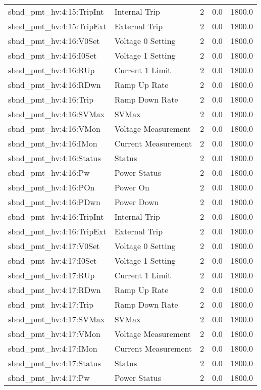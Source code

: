 \begin{center}
\begin{longtable}{l | l l l l }
sbnd\_pmt\_hv:4:15:TripInt & Internal Trip & 2 & 0.0 & 1800.0\\ 
sbnd\_pmt\_hv:4:15:TripExt & External Trip & 2 & 0.0 & 1800.0\\ 
sbnd\_pmt\_hv:4:16:V0Set & Voltage 0 Setting & 2 & 0.0 & 1800.0\\ 
sbnd\_pmt\_hv:4:16:I0Set & Voltage 1 Setting & 2 & 0.0 & 1800.0\\ 
sbnd\_pmt\_hv:4:16:RUp & Current 1 Limit & 2 & 0.0 & 1800.0\\ 
sbnd\_pmt\_hv:4:16:RDwn & Ramp Up Rate & 2 & 0.0 & 1800.0\\ 
sbnd\_pmt\_hv:4:16:Trip & Ramp Down Rate & 2 & 0.0 & 1800.0\\ 
sbnd\_pmt\_hv:4:16:SVMax & SVMax & 2 & 0.0 & 1800.0\\ 
sbnd\_pmt\_hv:4:16:VMon & Voltage Measurement & 2 & 0.0 & 1800.0\\ 
sbnd\_pmt\_hv:4:16:IMon & Current Measurement & 2 & 0.0 & 1800.0\\ 
sbnd\_pmt\_hv:4:16:Status & Status & 2 & 0.0 & 1800.0\\ 
sbnd\_pmt\_hv:4:16:Pw & Power Status & 2 & 0.0 & 1800.0\\ 
sbnd\_pmt\_hv:4:16:POn & Power On & 2 & 0.0 & 1800.0\\ 
sbnd\_pmt\_hv:4:16:PDwn & Power Down & 2 & 0.0 & 1800.0\\ 
sbnd\_pmt\_hv:4:16:TripInt & Internal Trip & 2 & 0.0 & 1800.0\\ 
sbnd\_pmt\_hv:4:16:TripExt & External Trip & 2 & 0.0 & 1800.0\\ 
sbnd\_pmt\_hv:4:17:V0Set & Voltage 0 Setting & 2 & 0.0 & 1800.0\\ 
sbnd\_pmt\_hv:4:17:I0Set & Voltage 1 Setting & 2 & 0.0 & 1800.0\\ 
sbnd\_pmt\_hv:4:17:RUp & Current 1 Limit & 2 & 0.0 & 1800.0\\ 
sbnd\_pmt\_hv:4:17:RDwn & Ramp Up Rate & 2 & 0.0 & 1800.0\\ 
sbnd\_pmt\_hv:4:17:Trip & Ramp Down Rate & 2 & 0.0 & 1800.0\\ 
sbnd\_pmt\_hv:4:17:SVMax & SVMax & 2 & 0.0 & 1800.0\\ 
sbnd\_pmt\_hv:4:17:VMon & Voltage Measurement & 2 & 0.0 & 1800.0\\ 
sbnd\_pmt\_hv:4:17:IMon & Current Measurement & 2 & 0.0 & 1800.0\\ 
sbnd\_pmt\_hv:4:17:Status & Status & 2 & 0.0 & 1800.0\\ 
sbnd\_pmt\_hv:4:17:Pw & Power Status & 2 & 0.0 & 1800.0\\ 

\end{longtable}
\end{center}
